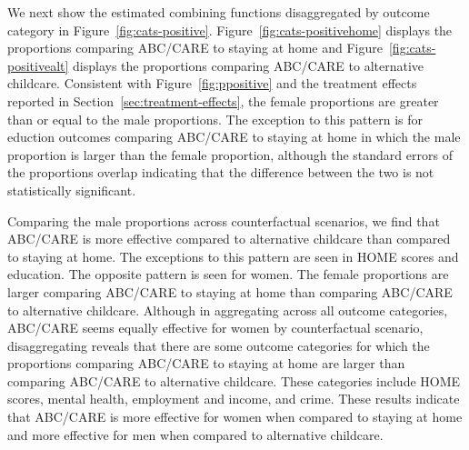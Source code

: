 We next show the estimated combining functions disaggregated by outcome category in Figure~\ref{fig:cats-positive}. Figure~\ref{fig:cats-positivehome} displays the proportions comparing ABC/CARE to staying at home and Figure~\ref{fig:cats-positivealt} displays the proportions comparing ABC/CARE to alternative childcare. Consistent with Figure~\ref{fig:ppositive} and the treatment effects reported in Section~\ref{sec:treatment-effects}, the female proportions are greater than or equal to the male proportions. The exception to this pattern is for eduction outcomes comparing ABC/CARE to staying at home in which the male proportion is larger than the female proportion, although the standard errors of the proportions overlap indicating that the difference between the two is not statistically significant. 

Comparing the male proportions across counterfactual scenarios, we find that ABC/CARE is more effective compared to alternative childcare than compared to staying at home. The exceptions to this pattern are seen in HOME scores and education. The opposite pattern is seen for women. The female proportions are larger comparing ABC/CARE to staying at home than comparing ABC/CARE to alternative childcare. Although in aggregating across all outcome categories, ABC/CARE seems equally effective for women by counterfactual scenario, disaggregating reveals that there are some outcome categories for which the proportions comparing ABC/CARE to staying at home are larger than comparing ABC/CARE to alternative childcare. These categories include HOME scores, mental health, employment and income, and crime. These results indicate that ABC/CARE is more effective for women when compared to staying at home and more effective for men when compared to alternative childcare.

